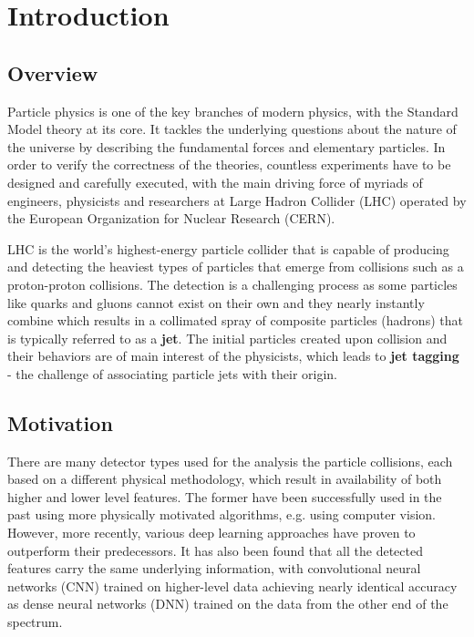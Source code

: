 \chapter{Introduction}

\section{Overview}
Particle physics is one of the key branches of modern physics, with the Standard Model theory at its core. It tackles the
underlying questions about the nature of the universe by describing the fundamental forces and elementary particles. In order
to verify the correctness of the theories, countless experiments have to be designed and carefully executed, with
the main driving force of myriads of engineers, physicists and researchers at Large Hadron Collider (LHC) operated by
the European Organization for Nuclear Research (CERN).

LHC is the world's highest-energy particle collider that is capable of producing and detecting the heaviest types of particles
that emerge from collisions such as a proton-proton collisions. The detection is a challenging process as some particles like
quarks and gluons cannot exist on their own and they nearly instantly combine which results in a collimated spray of composite
particles (hadrons) that is typically referred to as a \textbf{jet}\cite{RefWorks:RefID:4-cernjets}. The initial particles created upon collision
and their behaviors are of main interest of the physicists, which leads to \textbf{jet tagging} - the challenge of associating particle jets
with their origin.


\section{Motivation}
There are many detector types used for the analysis the particle collisions, each based on a different physical methodology, which
result in availability of both higher and lower level features. The former have been successfully used in the past using more physically
motivated algorithms, e.g. using computer vision\cite{RefWorks:RefID:5-cogan2015jet-images:}. However, more recently, various deep learning
approaches have proven to outperform their predecessors\cite{RefWorks:RefID:6-de2016jet-images}. It has also been found that all the
detected features carry the same underlying information, with convolutional neural networks (CNN) trained on higher-level data achieving
nearly identical accuracy as dense neural networks (DNN) trained on the data from the other end of the spectrum\cite{RefWorks:RefID:7-moore2019reports}.

